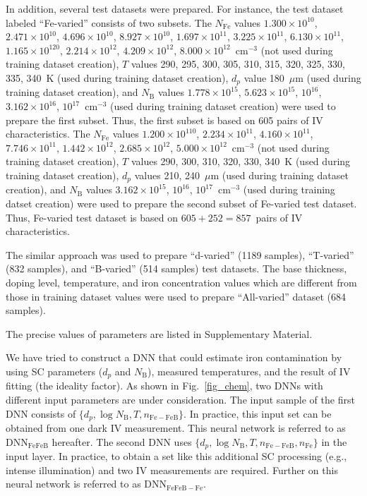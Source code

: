 \documentclass[num-refs]{wiley-article} %
\begin{document}
In addition, several test datasets were prepared.
For instance, the test dataset labeled ``Fe-varied'' consists of two subsets.
The $N_{\mathrm{Fe}}$ values
$1.300\times10^{10}$, $2.471\times10^{10}$, $4.696\times10^{10}$,
$8.927\times10^{10}$, $1.697\times10^{11}$, $3.225\times10^{11}$,
$6.130\times10^{11}$, $1.165\times10^{120}$, $2.214\times10^{12}$,
$4.209\times10^{12}$, $8.000\times10^{12}$~cm$^{-3}$
(not used during training dataset creation),
$T$ values 290, 295, 300, 305, 310, 315, 320, 325, 330, 335, 340~K
(used during training dataset creation),
$d_p$ value 180~$\mu$m (used during training dataset creation),
and $N_\mathrm{B}$ values
$1.778\times10^{15}$, $5.623\times10^{15}$, $10^{16}$,
$3.162\times10^{16}$, $10^{17}$~cm$^{-3}$
(used during training dataset creation)
were used to prepare the first subset.
Thus, the first subset is based on 605 pairs of IV characteristics.
The $N_{\mathrm{Fe}}$ values
$1.200\times10^{110}$, $2.234\times10^{11}$, $4.160\times10^{11}$,
$7.746\times10^{11}$, $1.442\times10^{12}$, $2.685\times10^{12}$,
$5.000\times10^{12}$~cm$^{-3}$
(not used during training dataset creation),
$T$ values 290, 300, 310, 320, 330, 340~K
(used during training dataset creation),
$d_p$ values 210, 240~$\mu$m (used during training dataset creation),
and $N_\mathrm{B}$ values
$3.162\times10^{15}$, $10^{16}$,
$10^{17}$~cm$^{-3}$
(used during training datset creation)
were used to prepare the second subset of Fe-varied test dataset.
Thus, Fe-varied test dataset is based on $605+252=857$~pairs of IV characteristics.

The similar approach was used to prepare ``d-varied'' (1189 samples), ``T-varied'' (832 samples), and ``B-varied'' (514 samples) test datasets.
The base thickness, doping level, temperature, and iron concentration values
which are different from those in training dataset values were used to prepare ``All-varied'' dataset (684 samples).

The precise values of parameters are listed in Supplementary Material.

We have tried to construct a DNN that could estimate iron contamination by using
SC parameters ($d_p$ and $N_\mathrm{B}$), measured temperatures, and the result of IV fitting (the ideality factor).
As shown in Fig.~\ref{fig_chem}, two DNNs with different input parameters are under consideration.
The input sample of the first DNN consists of $\{d_p,\log N_\mathrm{B},T,n_\mathrm{Fe-FeB}\}$.
In practice, this input set can be obtained from one dark IV measurement.
This neural network is referred to as DNN$_\mathrm{FeFeB}$ hereafter.
The second DNN uses  $\{d_p,\log N_\mathrm{B},T,n_\mathrm{Fe-FeB},n_\mathrm{Fe}\}$ in the input layer.
In practice, to obtain a set like this additional SC processing (e.g., intense illumination) and two IV measurements are required.
Further on this neural network is referred to as DNN$_\mathrm{FeFeB-Fe}$.
\end{document}
